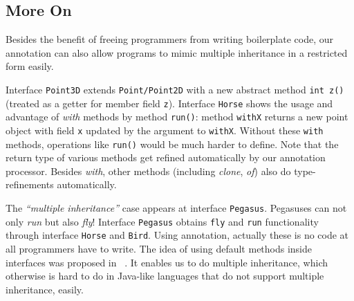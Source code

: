 \subsection{More On \mixin}
Besides the benefit of freeing programmers from writing boilerplate code, our
\mixin annotation can also allow programs to mimic multiple inheritance in a
restricted form easily.







Interface \texttt{Point3D} extends \texttt{Point/Point2D} with a new abstract
method \texttt{int z()} (treated as a getter for member field
\texttt{z}). Interface \texttt{Horse} shows the usage and advantage of
\emph{with} methods by method \texttt{run()}: method \texttt{withX} returns a
new point object with field \texttt{x} updated by the argument to
\texttt{withX}. Without these \texttt{with} methods, operations like
\texttt{run()} would be much harder to define. Note that the return type of
various methods get refined automatically by our annotation processor. Besides
\emph{with}, other methods (including \emph{clone}, \emph{of}) also do
type-refinements automatically.

The \emph{``multiple inheritance''} case appears at interface
\texttt{Pegasus}. Pegasuses can not only \emph{run} but also \emph{fly}!
Interface \texttt{Pegasus} obtains \texttt{fly} and \texttt{run} functionality
through interface \texttt{Horse} and \texttt{Bird}. Using \mixin annotation,
actually these is no code at all programmers have to write. The idea of using
default methods inside interfaces was proposed in ~\cite{}. It enables us to do
multiple inheritance, which otherwise is hard to do in Java-like languages that
do not support multiple inheritance, easily.
